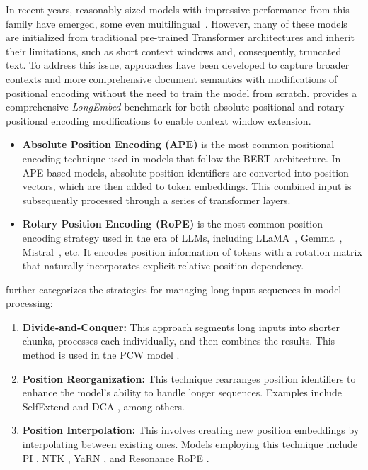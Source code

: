 In recent years, reasonably sized models with impressive performance from this family have emerged, some even multilingual~\parencite{wang2024multilinguale5textembeddings}. 
However, many of these models are initialized from traditional pre-trained Transformer architectures and inherit their limitations, such as short context windows and, consequently, truncated text.
To address this issue, approaches have been developed to capture broader contexts and more comprehensive document semantics with modifications of positional encoding without the need to train the model from scratch.
\textcite{zhu2024longembedextendingembeddingmodels} provides a comprehensive \textit{LongEmbed} benchmark for both absolute positional and rotary positional encoding modifications to enable context window extension.
\begin{itemize}
    \item \textbf{Absolute Position Encoding (APE)} is the most common positional encoding technique used in models that follow the BERT architecture. In APE-based models, absolute position identifiers are converted into position vectors, which are then added to token embeddings. This combined input is subsequently processed through a series of transformer layers.
    \item \textbf{Rotary Position Encoding (RoPE)} is the most common position encoding strategy used in the era of LLMs, including LLaMA~\parencite{touvron2023llama}, Gemma~\parencite{gemma_2024}, Mistral~\parencite{jiang2023mistral7b}, etc. 
    It encodes position information of tokens with a rotation matrix that naturally incorporates explicit relative position dependency.
\end{itemize}
\textcite{zhu2024longembedextendingembeddingmodels} further categorizes the strategies for managing long input sequences in model processing:
\begin{enumerate}
    \item \textbf{Divide-and-Conquer:} This approach segments long inputs into shorter chunks, processes each individually, and then combines the results. This method is used in the PCW model \parencite{ratner2023parallelcontextwindowslarge}.
    \item \textbf{Position Reorganization:} This technique rearranges position identifiers to enhance the model's ability to handle longer sequences. Examples include SelfExtend \parencite{jin2024llmmaybelonglmselfextend} and DCA \parencite{an2024trainingfreelongcontextscalinglarge}, among others.
    \item \textbf{Position Interpolation:} This involves creating new position embeddings by interpolating between existing ones. Models employing this technique include PI \parencite{chen2023extendingcontextwindowlarge}, NTK \parencite{peng2023ntkaware}, YaRN \parencite{peng2023yarnefficientcontextwindow}, and Resonance RoPE \parencite{wang2024resonanceropeimprovingcontext}.
\end{enumerate}
